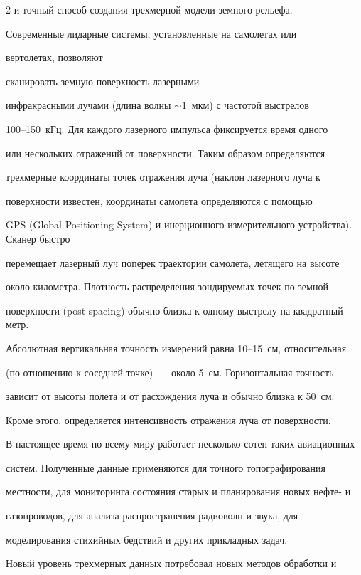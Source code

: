 \begin{multicols}{2}
и точный способ создания трехмерной модели земного рельефа.

   

   Современные лидарные системы, установленные на самолетах или 

вертолетах, позволяют\linebreak

 сканировать земную поверхность лазерными 

инфракрасными лучами (длина волны $\sim  1$~мкм) с час\-то\-той выстрелов 

   100--150~кГц. Для каждого лазерного импульса фиксируется время одного 

или нескольких отражений от поверхности. Таким образом определяются 

трехмерные координаты точек отражения луча (наклон лазерного луча к 

по\-верх\-ности известен, координаты самолета определяются с помощью 

GPS (Global Positioning System) и инерционного измерительного устройства). Сканер быст\-ро 

перемещает лазерный луч поперек траектории самолета, летящего на высоте 

около километра. Плотность распределения зондируемых точек по земной 

поверхности (post spacing) обычно близка к одному выстрелу на квад\-рат\-ный метр. 

Абсолютная вертикальная точность измерений равна 10--15~см, относительная 

(по отношению к соседней точке)~--- около 5~см. Горизонтальная точность 

зависит от высоты полета и от расхождения луча и обычно близка к 50~см. 

Кроме этого, определяется интенсивность отражения луча от поверхности. 



В  настоящее время по всему миру работает несколько сотен таких авиационных 

сис\-тем. Полученные данные применяются для точного топографирования 

местности, для мониторинга состояния старых и планирования новых нефте- и 

газопроводов, для анализа распространения радиоволн и звука, для 

моделирования стихийных бедствий и других прикладных задач.

   

   Новый уровень трехмерных данных потребовал новых методов обработки и 


\end{multicols}

